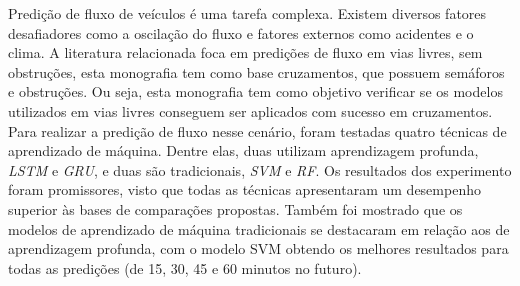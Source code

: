 Predição de fluxo de veículos é uma tarefa complexa. Existem diversos fatores desafiadores como a oscilação do fluxo e fatores externos como acidentes e o clima. A literatura relacionada foca em predições de fluxo em vias livres, sem obstruções, esta monografia tem como base cruzamentos, que possuem semáforos e obstruções. Ou seja, esta monografia tem como objetivo verificar se os modelos utilizados em vias livres conseguem ser aplicados com sucesso em cruzamentos.  Para realizar a predição de fluxo nesse cenário, foram testadas quatro técnicas de aprendizado de máquina. Dentre elas, duas utilizam aprendizagem profunda, \textit{\acrfull{LSTM}} e \textit{\acrfull{GRU}}, e duas são tradicionais, \textit{\acrfull{SVM}} e \textit{\acrfull{RF}}. Os resultados dos experimento foram promissores, visto que todas as técnicas apresentaram um desempenho superior às bases de comparações propostas. Também foi mostrado que os modelos de aprendizado de máquina tradicionais se destacaram em relação aos de aprendizagem profunda, com o modelo \acrshort{SVM} obtendo os melhores resultados para todas as predições (de 15, 30, 45 e 60 minutos no futuro).